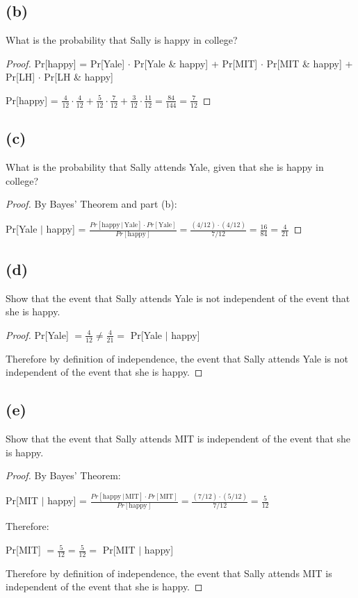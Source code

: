 \documentclass[14pt]{extarticle}
\newcommand{\dps}{\displaystyle}
\begin{document}
\subsection{(b)}
What is the probability that Sally is happy in college?

\begin{proof}
Pr[happy] = Pr[Yale] $\cdot$ Pr[Yale \& happy] + Pr[MIT] $\cdot$ Pr[MIT \& happy] + Pr[LH] $\cdot$ Pr[LH \& happy]

Pr[happy] = $\dps\frac{4}{12}\cdot\frac{4}{12} + \frac{5}{12}\cdot\frac{7}{12} + \frac{3}{12}\cdot\frac{11}{12} = \frac{84}{144} = \frac{7}{12}$
\end{proof}

\subsection{(c)}
What is the probability that Sally attends Yale, given that she is happy in college?

\begin{proof}
By Bayes' Theorem and part (b):

Pr[Yale $|$ happy] = $\dps\frac{Pr[\text{happy} \,|\, \text{Yale}] \cdot Pr[\text{Yale}]}{Pr[\text{happy}]} = \frac{(4/12)\cdot(4/12)}{7/12} = \frac{16}{84} = \frac{4}{21}$
\end{proof}

\subsection{(d)}
Show that the event that Sally attends Yale is not independent of the event that she is happy.

\begin{proof}
Pr[Yale] $\dps = \frac{4}{12} \neq \frac{4}{21} = $ Pr[Yale $|$ happy]

Therefore by definition of independence, the event that Sally attends Yale is not independent of the event that she is happy.
\end{proof}

\subsection{(e)}
Show that the event that Sally attends MIT is independent of the event that she is happy.
\begin{proof}
By Bayes' Theorem:

Pr[MIT $|$ happy] = $\dps\frac{Pr[\text{happy} \,|\, \text{MIT}] \cdot Pr[\text{MIT}]}{Pr[\text{happy}]} = \frac{(7/12)\cdot(5/12)}{7/12} = \frac{5}{12}$

Therefore:

Pr[MIT] $\dps = \frac{5}{12} = \frac{5}{12} = $ Pr[MIT $|$ happy]

Therefore by definition of independence, the event that Sally attends MIT is independent of the event that she is happy.
\end{proof}
\end{document}
